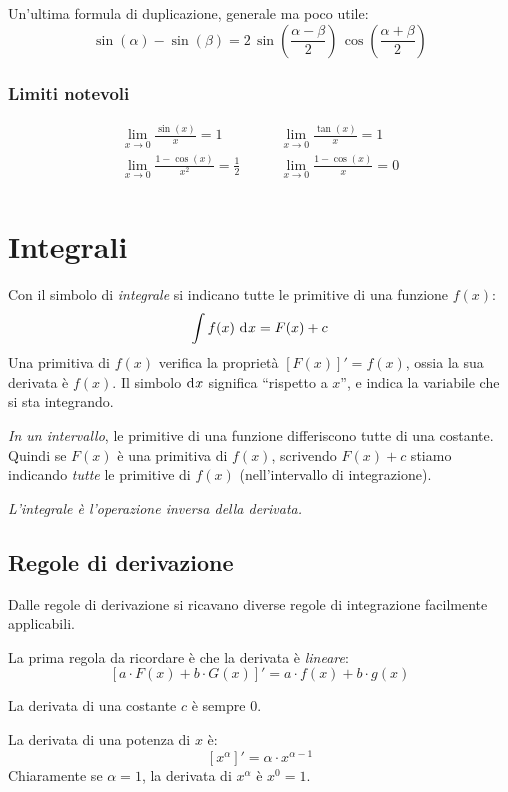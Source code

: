 Un'ultima formula di duplicazione, generale ma poco utile:
\[
\sin(\alpha) - \sin(\beta) = 
2 \, \sin \left( \frac{\alpha - \beta}{2} \right) \, \cos \left( \frac{\alpha + \beta}{2} \right)
\]

\subsection{Limiti notevoli}

\begin{align*}
\lim_{x \to 0} \frac{\sin (x)}{x} = 1
&\qquad
\lim_{x \to 0} \frac{\tan (x)}{x} = 1
\\
\lim_{x \to 0} \frac{1 - \cos(x)}{x^2} = \frac{1}{2}
&\qquad
\lim_{x \to 0} \frac{1 - \cos (x)}{x} = 0
\\
\end{align*}

\chapter{Integrali}

Con il simbolo di \emph{integrale} si indicano tutte le primitive di una funzione $f(x)$:
\[
\int f(x) \dx = F(x) + c
\]
Una primitiva di $f(x)$ verifica la propriet\`a $[F(x)]' = f(x)$, ossia
la sua derivata \`e $f(x)$.
Il simbolo $\diff x$ significa ``rispetto a $x$'', e indica la variabile 
che si sta integrando.

\emph{In un intervallo}, le primitive di una funzione differiscono tutte 
di una costante. Quindi se $F(x)$ \`e una primitiva di $f(x)$, scrivendo
$F(x) + c$ stiamo indicando \emph{tutte} le primitive di $f(x)$ 
(nell'intervallo di integrazione).

\emph{L'integrale \`e l'operazione inversa della derivata.}

\section{Regole di derivazione}

Dalle regole di derivazione si ricavano diverse regole di integrazione 
facilmente applicabili.

La prima regola da ricordare \`e che la derivata \`e \emph{lineare}:
\[
\left[ a \cdot F(x) + b \cdot G(x) \right]' =
a \cdot f(x) + b \cdot g(x)
\]

La derivata di una costante $c$ \`e sempre 0.

La derivata di una potenza di $x$ \`e:
\[
\left[ x^{\alpha} \right]' = \alpha \cdot x^{\alpha - 1}
\]
Chiaramente se $\alpha = 1$, la derivata di $x^{\alpha}$ \`e $x^0 = 1$.

